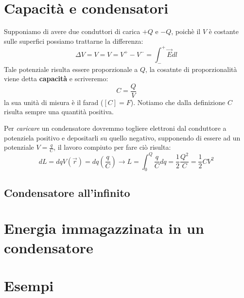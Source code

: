 \documentclass{book}
\begin{document}
\section{Capacit\`a e condensatori}
Supponiamo di avere due conduttori di carica $+Q$ e $-Q$, poichè il $V$ è costante sulle superfici possiamo trattarne la differenza:
\[
\Delta V = V = V = V^+ -V^- = \int_{-}^{+} \vec{E} dl
\]
Tale potenziale risulta essere proporzionale a $Q$, la cosatnte di proporzionalità viene detta \textbf{capacità} e scriveremo:
\[
C=\frac{Q}{V}
\]
la sua unità di misura è il farad ($[C]=F$). Notiamo che dalla definizione $C$ risulta sempre una quantità positiva.

Per \textit{caricare} un condensatore dovremmo togliere elettroni dal conduttore a potenziela positivo e depositarli su quello negativo,
supponendo di essere ad un potenziale $V=\frac{q}{C}$, il lavoro compiuto per fare ciò risulta:
\[
dL = dq V(\vec{r})= dq (\frac{q}{C}) \rightarrow L = \int_{0}^{Q}\frac{q}{C}dq =\frac{1}{2}\frac{Q^2}{C}=\frac{1}{2}CV^2
\]
\subsection{Condensatore all'infinito}
\section{Energia immagazzinata in un condensatore}
\section{Esempi}
\end{document}
